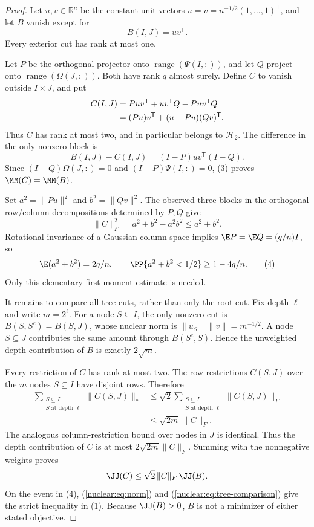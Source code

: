 \documentclass[11pt,oneside,openany,a4paper]{book}
\numberwithin{equation}{chapter}
\theoremstyle{definition}
\theoremstyle{remark}
\newcommand{\HH}{\mathcal H}\newcommand{\SSS}{\mathcal S}
\begin{document}
\begin{proof}
Let $u,v\in\mathbb R^n$ be the constant unit vectors
$u=v=n^{-1/2}(1,\ldots,1)^{\mathsf T}$, and let $B$ vanish except for
\[
 B(I,J)=uv^{\mathsf T}.
\]
Every exterior cut has rank at most one.

Let $P$ be the orthogonal projector onto
$\operatorname{range}(\Psi(I,:))$, and let $Q$ project onto
$\operatorname{range}(\Omega(J,:))$. Both have rank $q$ almost surely.
Define $C$ to vanish outside $I\times J$, and put
\begin{align}
 C(I,J)
 &=Puv^{\mathsf T}+uv^{\mathsf T}Q-Puv^{\mathsf T}Q \notag\\
 &=(Pu)v^{\mathsf T}+(u-Pu)(Qv)^{\mathsf T}.
 \label{nuclear:eq:competitor}
\end{align}
Thus $C$ has rank at most two, and in particular belongs to $\HH_2$.
The difference in the only nonzero block is
\[
 B(I,J)-C(I,J)=(I-P)uv^{\mathsf T}(I-Q).
 \tag{3}
\]
Since $(I-Q)\Omega(J,:)=0$ and $(I-P)\Psi(I,:)=0$, (3) proves
$\MM(C)=\MM(B)$.

Set $a^2=\|Pu\|^2$ and $b^2=\|Qv\|^2$. The observed three blocks in the
orthogonal row/column decompositions determined by $P,Q$ give
\begin{equation}\label{nuclear:eq:norm}
 \|C\|_F^2=a^2+b^2-a^2b^2\le a^2+b^2.
\end{equation}
Rotational invariance of a Gaussian column space implies
$\E P=\E Q=(q/n)I$, so
\[
 \E(a^2+b^2)=2q/n,\qquad
 \PP\{a^2+b^2<1/2\}\ge1-4q/n.
 \tag{4}
\]
Only this elementary first-moment estimate is needed.

It remains to compare all tree cuts, rather than only the root cut.
Fix depth $\ell$ and write $m=2^\ell$. For a node $S\subseteq I$,
the only nonzero cut is $B(S,S^c)=B(S,J)$, whose nuclear norm is
$\|u_S\|\|v\|=m^{-1/2}$. A node $S\subseteq J$ contributes
the same amount through $B(S^c,S)$. Hence the unweighted depth
contribution of $B$ is exactly $2\sqrt m$.

Every restriction of $C$ has rank at most two. The row restrictions
$C(S,J)$ over the $m$ nodes $S\subseteq I$ have disjoint rows. Therefore
\begin{align*}
 \sum_{\substack{S\subseteq I\\S\text{ at depth }\ell}}
 \|C(S,J)\|_*
 &\le\sqrt2
 \sum_{\substack{S\subseteq I\\S\text{ at depth }\ell}}
 \|C(S,J)\|_F\\
 &\le\sqrt{2m}\,\|C\|_F.
\end{align*}
The analogous column-restriction bound over nodes in $J$ is identical.
Thus the depth contribution of $C$ is at most
$2\sqrt{2m}\|C\|_F$. Summing with the nonnegative weights proves
\begin{equation}\label{nuclear:eq:tree-comparison}
 \JJ(C)\le\sqrt2\,\|C\|_F\,\JJ(B).
\end{equation}
On the event in (4), (\ref{nuclear:eq:norm}) and
(\ref{nuclear:eq:tree-comparison}) give the strict inequality in (1).
Because $\JJ(B)>0$, $B$ is not a minimizer of either stated objective.


\end{proof}
\end{document}
